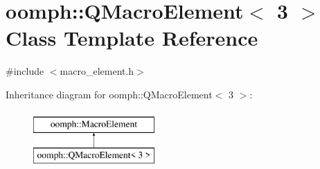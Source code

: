 \hypertarget{classoomph_1_1QMacroElement_3_013_01_4}{}\section{oomph\+:\+:Q\+Macro\+Element$<$ 3 $>$ Class Template Reference}
\label{classoomph_1_1QMacroElement_3_013_01_4}


{\ttfamily \#include $<$macro\+\_\+element.\+h$>$}

Inheritance diagram for oomph\+:\+:Q\+Macro\+Element$<$ 3 $>$\+:\begin{figure}[H]
\begin{center}
\leavevmode
\includegraphics[height=2.000000cm]{classoomph_1_1QMacroElement_3_013_01_4}
\end{center}
\end{figure}
